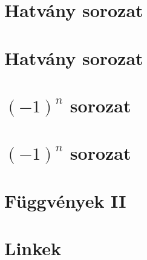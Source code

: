 \begin{spacing}{1.4}
\section*{Hatvány sorozat} \label{DBmatlabia13}
\Fa{

}
\vspace{0.5cm}
\newpage
\section*{Hatvány sorozat} \label{DBmatlabia13Mo}
\Mo{

}
\vspace{0.5cm}
\newpage
\section*{$(-1)^n$ sorozat} \label{DBmatlabia14}
\Fa{

}
\vspace{0.5cm}
\newpage
\section*{$(-1)^n$ sorozat} \label{DBmatlabia14Mo}
\Mo{

}
\vspace{0.5cm}
\newpage
\section*{Függvények II} \label{DBmatlabia15}
\Desc{

}
\vspace{0.5cm}
\newpage
\section*{Linkek} \label{DBlink}
\Desc{

}
\vspace{0.5cm}
\newpage

\end{spacing}


